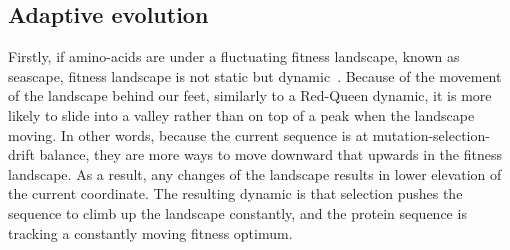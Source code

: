 \begin{table}[H]
    \centering
    \noindent{}
    \caption[Parameters of classical and mechanistic codon models]{Relationship between classical and mechanistic codon models}
    \label{table:params-codon-models}
\end{table}

\subsection{Adaptive evolution}
\label{subsec:adaptive-evolution}

Firstly, if amino-acids are under a fluctuating fitness landscape, known as seascape, fitness landscape is not static but dynamic~\citep{Mustonen2009}.
Because of the movement of the landscape behind our feet, similarly to a Red-Queen dynamic, it is more likely to slide into a valley rather than on top of a peak when the landscape moving.
In other words, because the current sequence is at mutation-selection-drift balance, they are more ways to move downward that upwards in the fitness landscape.
As a result, any changes of the landscape results in lower elevation of the current coordinate.
The resulting dynamic is that selection pushes the sequence to climb up the landscape constantly, and the protein sequence is tracking a constantly moving fitness optimum.

